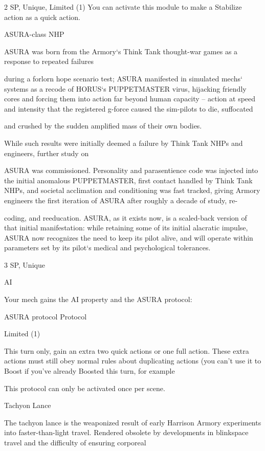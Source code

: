 2 SP, Unique, Limited (1)
You can activate this module to make a Stabilize action as a quick action.


ASURA-class NHP

ASURA was born from the Armory‘s Think Tank thought-war games as a response to repeated failures

during a forlorn hope scenario test; ASURA manifested in simulated mechs‘ systems as a recode of
HORUS‘s PUPPETMASTER virus, hijacking friendly cores and forcing them into action far beyond human
capacity -- action at speed and intensity that the registered g-force caused the sim-pilots to die, suffocated

and crushed by the sudden amplified mass of their own bodies.

While such results were initially deemed a failure by Think Tank NHPs and engineers, further study on

ASURA was commissioned. Personality and parasentience code was injected into the initial anomalous
PUPPETMASTER, first contact handled by Think Tank NHPs, and societal acclimation and conditioning
was fast tracked, giving Armory engineers the first iteration of ASURA after roughly a decade of study, re-

coding, and reeducation. ASURA, as it exists now, is a scaled-back version of that initial manifestation:
while retaining some of its initial alacratic impulse, ASURA now recognizes the need to keep its pilot alive,
and will operate within parameters set by its pilot‘s medical and psychological tolerances.

3 SP, Unique

AI

Your mech gains the AI property and the ASURA protocol:

         ASURA protocol
	        Protocol

         Limited (1)





         This turn only, gain an extra two quick actions or one full action. These extra actions must
         still obey normal rules about duplicating actions (you can’t use it to Boost if you’ve
         already Boosted this turn, for example

         This protocol can only be activated once per scene.


Tachyon Lance

The tachyon lance is the weaponized result of early Harrison Armory experiments into faster-than-light
travel. Rendered obsolete by developments in blinkspace travel and the difficulty of ensuring corporeal

